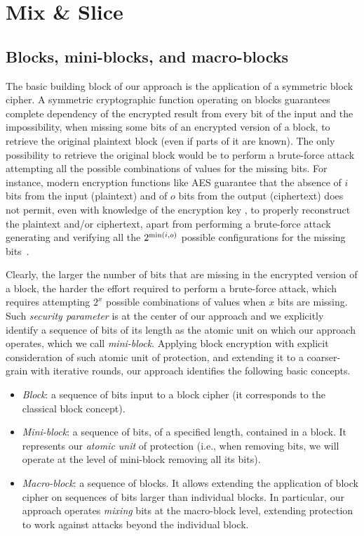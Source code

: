 
\section{Mix \& Slice}\label{ms:sec:mixslice}

\subsection{Blocks, mini-blocks, and macro-blocks}

The basic building block of our approach is the application of a symmetric block cipher. A symmetric cryptographic function operating on blocks guarantees complete dependency of the encrypted result from every bit of the input and the impossibility, when missing some bits of an encrypted version of a block, to retrieve the original plaintext block (even if parts of it are known). The only possibility to retrieve the original block would be to perform a brute-force attack attempting all the possible combinations of values for the missing bits. For instance, modern encryption functions like AES guarantee that the absence of $i$ bits from the input (plaintext) and of $o$ bits from the output (ciphertext) does not permit, even with knowledge of the encryption key \key{}, to properly reconstruct the plaintext and/or ciphertext, apart from performing a brute-force attack generating and verifying all the $2^{{\rm min}(i,o)}$ possible configurations for the missing bits~\cite{abm14}.

Clearly, the larger the number of bits that are missing in the encrypted version of a block, the harder the effort required to perform a brute-force attack, which requires attempting $2^x$ possible combinations of values when $x$ bits are missing. Such {\em security parameter\/} is at the center of our approach and we explicitly identify a sequence of bits of its length as the atomic unit on which our approach operates, which we call {\em mini-block\/}. Applying block encryption with explicit consideration of such atomic unit of protection, and extending it to a coarser-grain with iterative rounds, our approach identifies the following basic concepts.

\begin{itemize}

\item {\em Block\/}: a sequence of bits input to a
  block cipher (it corresponds to the classical block concept).

\item {\em Mini-block\/}: a sequence of bits, of a specified length,
  contained in a block. It represents our {\em atomic unit\/} of
  protection (i.e., when removing bits, we will operate at the
  level of mini-block removing all its bits).

\item {\em Macro-block\/}: a sequence of blocks. It allows extending
  the application of block cipher on sequences of bits larger than
  individual blocks. In particular, our approach operates {\em
    mixing\/} bits at the macro-block level, extending protection to
  work against attacks beyond the individual block.

\end{itemize}

